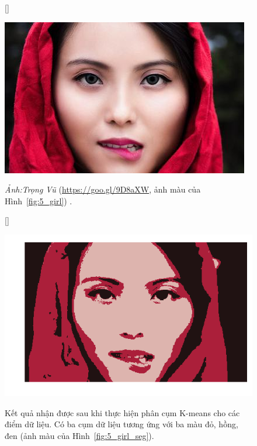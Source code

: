 \begin{figure}[t]
[\FBwidth]
{\caption{
\textit{Ảnh:Trọng Vũ} (\url{https://goo.gl/9D8aXW}, ảnh màu của Hình~\ref{fig:5_girl}) .
}
\label{fig:5_girl_c}}
{ %
\includegraphics[width=.5\textwidth]{Chapters/03_SimpleML/4_kmeans/girl3.jpg}
}
\end{figure}
\begin{figure}[t]
[\FBwidth]
{\caption{
Kết quả nhận được sau khi thực hiện phân cụm K-means cho các điểm dữ liệu.
Có ba cụm dữ liệu tương ứng với ba màu đỏ, hồng, đen (ảnh màu của Hình~\ref{fig:5_girl_seg}).
}
\label{fig:5_girl_seg_c}}
{ %
\includegraphics[width=.5\textwidth]{Chapters/03_SimpleML/4_kmeans/girl_seg.png}
}
\end{figure}

